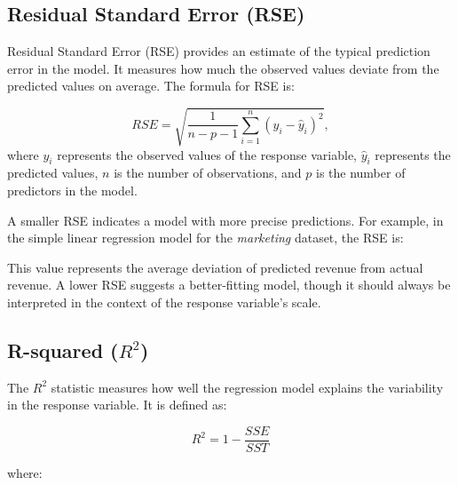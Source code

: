 \documentclass[
  11pt,
]{book}
\makeatletter
\newenvironment{Shaded}{}{}
\newcommand{\DecValTok}[1]{#1}
\newcommand{\FloatTok}[1]{#1}
\newcommand{\FunctionTok}[1]{#1}
\newcommand{\NormalTok}[1]{#1}
\newcommand{\OtherTok}[1]{\textcolor[rgb]{0.39,0.39,0.39}{#1}}
\newcommand{\SpecialCharTok}[1]{\textcolor[rgb]{0.39,0.39,0.39}{#1}}
\newenvironment{kframe}{%
\medskip{}
\setlength{\fboxsep}{.8em}
 \def\at@end@of@kframe{}%
 \ifinner\ifhmode%
  \def\at@end@of@kframe{\end{minipage}}%
  \begin{minipage}{\columnwidth}%
 \fi\fi%
 \def\FrameCommand##1{\hskip\@totalleftmargin \hskip-\fboxsep
 \colorbox{shadecolor}{##1}\hskip-\fboxsep
     \hskip-\linewidth \hskip-\@totalleftmargin \hskip\columnwidth}%
 \MakeFramed {\advance\hsize-\width
   \@totalleftmargin\z@ \linewidth\hsize
   \@setminipage}}%
 {\par\unskip\endMakeFramed%
 \at@end@of@kframe}
\renewenvironment{Shaded}{\begin{kframe}}{\end{kframe}}
\theoremstyle{definition}
\theoremstyle{definition}
\theoremstyle{definition}
\theoremstyle{definition}
\theoremstyle{remark}
\makeatother
\begin{document}
\subsection*{Residual Standard Error (RSE)}\label{residual-standard-error-rse}


Residual Standard Error (RSE) provides an estimate of the typical prediction error in the model. It measures how much the observed values deviate from the predicted values on average. The formula for RSE is:

\[
RSE = \sqrt{\frac{1}{n-p-1} \sum_{i=1}^{n} (y_i - \hat{y}_i)^2},
\]
where \(y_i\) represents the observed values of the response variable, \(\hat{y}_i\) represents the predicted values, \(n\) is the number of observations, and \(p\) is the number of predictors in the model.

A smaller RSE indicates a model with more precise predictions. For example, in the simple linear regression model for the \emph{marketing} dataset, the RSE is:

\begin{Shaded}
\end{Shaded}

This value represents the average deviation of predicted revenue from actual revenue. A lower RSE suggests a better-fitting model, though it should always be interpreted in the context of the response variable's scale.

\subsection*{\texorpdfstring{R-squared (\(R^2\))}{R-squared (R\^{}2)}}\label{r-squared-r2}


The \(R^2\) statistic measures how well the regression model explains the variability in the response variable. It is defined as:

\[
R^2 = 1 - \frac{SSE}{SST}
\]

where:
\end{document}
